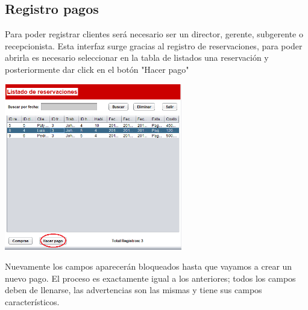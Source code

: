 \documentclass[12pt]{article}
\begin{document}
\begin{flushleft}
\section{Registro pagos}
\textsf{Para poder registrar clientes será necesario ser un director, gerente, subgerente o recepcionista. Esta interfaz surge gracias al registro de reservaciones, para poder abrirla es necesario seleccionar en la tabla de listados una reservación y posteriormente dar click en el botón "Hacer pago"}

\vspace{0.5cm}
\begin{center}
\includegraphics[width=7.75cm]{hacerpago.png}
\end{center}

\vspace{0.5cm}
\textsf{Nuevamente los campos aparecerán bloqueados hasta que vayamos a crear un nuevo pago. El proceso es exactamente igual a los anteriores; todos los campos deben de llenarse, las advertencias son las mismas y tiene sus campos característicos.}


\end{flushleft}
\end{document}

